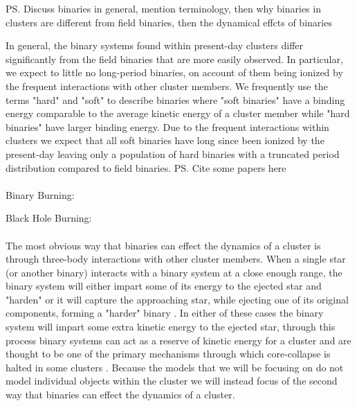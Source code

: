\ps{Discuss binaries in general, mention terminology, then why binaries in clusters are different from field binaries, then the dynamical effcts of binaries}

In general, the binary systems found within present-day clusters differ significantly from the field
binaries that are more easily observed. In particular, we expect to little no long-period binaries,
on account of them being ionized by the frequent interactions with other cluster members. We
frequently use the terms "hard" and "soft" to describe binaries where "soft binaries" have a binding
energy comparable to the average kinetic energy of a cluster member while "hard binaries" have
larger binding energy. Due to the frequent interactions within clusters we expect that all soft
binaries have long since been ionized by the present-day leaving only a population of hard binaries
with a truncated period distribution compared to field binaries.
\ps{Cite some papers here}

\paragraph{}
Binary Burning: \citet{Chatterjee2013}


Black Hole Burning: \citet{Kremer2019}
\paragraph{}



The most obvious way that binaries can effect the dynamics of a cluster is through three-body
interactions with other cluster members. When a single star (or another binary) interacts with a
binary system at a close enough range, the binary system will either impart some of its energy to
the ejected star and "harden" or it will capture the approaching star, while ejecting one of its
original components, forming a "harder" binary \citep{Heggie2003}. In either of these cases the
binary system will impart some extra kinetic energy to the ejected star, through this process binary
systems can act as a reserve of kinetic energy for a cluster and are thought to be one of the
primary mechanisms through which core-collapse is halted in some clusters \citep{Chatterjee2013}.
Because the models that we will be focusing on do not model individual objects within the cluster we
will instead focus of the second way that binaries can effect the dynamics of a cluster.

